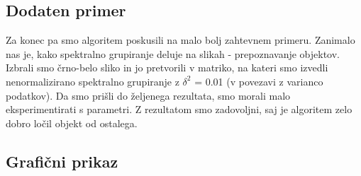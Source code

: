 \documentclass[a4paper, 10pt]{article}
\begin{document}
\subsection{Dodaten primer}
Za konec pa smo algoritem poskusili na malo bolj zahtevnem primeru. Zanimalo nas je, kako spektralno grupiranje deluje na slikah - prepoznavanje objektov. Izbrali smo črno-belo sliko in jo pretvorili v matriko, na kateri smo izvedli nenormalizirano spektralno grupiranje z $\delta^2$ = 0.01 (v povezavi z varianco podatkov). Da smo prišli do željenega rezultata, smo morali malo eksperimentirati s parametri. Z rezultatom smo zadovoljni, saj je algoritem zelo dobro ločil objekt od ostalega.
\subsection{Grafični prikaz}
\end{document}
